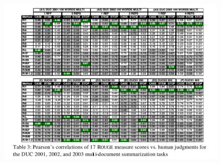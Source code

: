 \documentclass[xcolor={table}]{beamer}
\begin{document}
\begin{frame}[t]{\cite{lin2004rouge}}
      \begin{figure}[h]
          \centering
      \includegraphics[scale=.25]{images/table3-lin04.png} \\
  \end{figure}
\end{frame}
\end{document}
